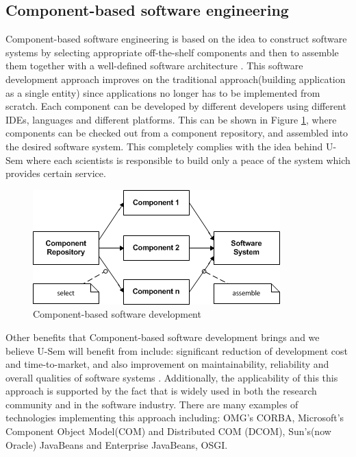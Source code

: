 \subsection{Component-based software engineering}

Component-based software engineering is based on the idea to construct software systems by selecting appropriate off-the-shelf components and then to assemble them together with a well-defined software architecture \cite{Pour}. This software development approach improves on the traditional approach(building application as a single entity) since applications no longer has to be implemented from scratch. Each component can be developed by different developers using different IDEs, languages and different platforms. This can be shown in Figure \ref{fig_cbsd}, where components can be checked out from a component repository, and assembled into the desired software system. This completely complies with the idea behind U-Sem where each scientists is responsible to build only a peace of the system which provides certain service.

\begin{figure}[h!]
  \centering
  	\includegraphics[scale=0.75]{plug-in/component-based.png}
  \caption{Component-based software development \cite{Pour} }
  \label{fig_cbsd}
\end{figure}

Other benefits that Component-based software development brings and we believe U-Sem will benefit from include: significant reduction of development cost and time-to-market, and also improvement on maintainability, reliability and overall qualities of software systems \cite{Pour1} \cite{Pour2}. Additionally, the applicability of this this approach is supported by the fact that is widely used in both the research community and in the software industry. There are many examples of technologies implementing this approach including: OMG's CORBA,  Microsoft's Component Object Model(COM) and Distributed COM (DCOM), Sun's(now Oracle) JavaBeans and Enterprise JavaBeans, OSGI.

